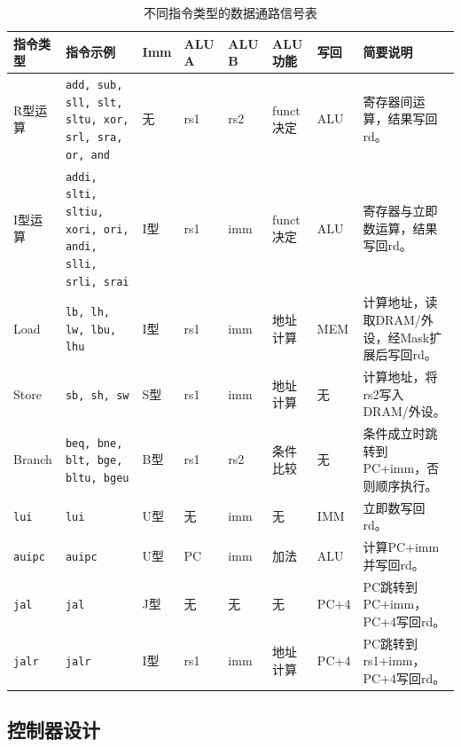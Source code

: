 \documentclass[UTF8,a4paper,12pt]{ctexart}
\begin{document}
\begin{table}[H]
\centering
\caption{不同指令类型的数据通路信号表}
\label{tab:datapath_signals}
\scriptsize
\setlength{\tabcolsep}{3pt}
\renewcommand{\arraystretch}{1.15}
\begin{tabularx}{\textwidth}{
>{\centering\arraybackslash}p{1.35cm}
>{\raggedright\arraybackslash}p{2.4cm}
>{\centering\arraybackslash}p{0.9cm}
>{\centering\arraybackslash}p{1.1cm}
>{\centering\arraybackslash}p{1.1cm}
>{\centering\arraybackslash}p{1.35cm}
>{\centering\arraybackslash}p{1.2cm}
X}
\toprule
指令类型 & 指令示例 & Imm & ALU A & ALU B & ALU功能 & 写回 & 简要说明 \\
\midrule

R型运算 &
\texttt{add, sub, sll, slt, sltu, xor, srl, sra, or, and} &
无 & rs1 & rs2 & funct决定 & ALU &
寄存器间运算，结果写回rd。 \\

I型运算 &
\texttt{addi, slti, sltiu, xori, ori, andi, slli, srli, srai} &
I型 & rs1 & imm & funct决定 & ALU &
寄存器与立即数运算，结果写回rd。 \\

Load &
\texttt{lb, lh, lw, lbu, lhu} &
I型 & rs1 & imm & 地址计算 & MEM &
计算地址，读取DRAM/外设，经Mask扩展后写回rd。 \\

Store &
\texttt{sb, sh, sw} &
S型 & rs1 & imm & 地址计算 & 无 &
计算地址，将rs2写入DRAM/外设。 \\

Branch &
\texttt{beq, bne, blt, bge, bltu, bgeu} &
B型 & rs1 & rs2 & 条件比较 & 无 &
条件成立时跳转到PC+imm，否则顺序执行。 \\

\texttt{lui} &
\texttt{lui} &
U型 & 无 & imm & 无 & IMM &
立即数写回rd。 \\

\texttt{auipc} &
\texttt{auipc} &
U型 & PC & imm & 加法 & ALU &
计算PC+imm并写回rd。 \\

\texttt{jal} &
\texttt{jal} &
J型 & 无 & 无 & 无 & PC+4 &
PC跳转到PC+imm，PC+4写回rd。 \\

\texttt{jalr} &
\texttt{jalr} &
I型 & rs1 & imm & 地址计算 & PC+4 &
PC跳转到rs1+imm，PC+4写回rd。 \\

\bottomrule
\end{tabularx}
\end{table}

\subsection{控制器设计}
\end{document}
